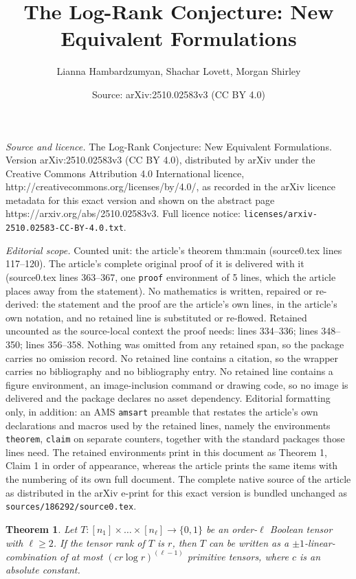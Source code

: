 \documentclass[10pt,a4paper]{amsart}
\title{The Log-Rank Conjecture: New Equivalent Formulations}
\author{Lianna Hambardzumyan, Shachar Lovett, Morgan Shirley}
\date{Source: arXiv:2510.02583v3 (CC BY 4.0)}
\newtheorem{theorem}{Theorem}
\begin{document}
\maketitle

\noindent\emph{Source and licence.} The Log-Rank Conjecture: New Equivalent Formulations. Version arXiv:2510.02583v3 (CC BY 4.0), distributed by arXiv under the Creative Commons Attribution 4.0 International licence, http://creativecommons.org/licenses/by/4.0/, as recorded in the arXiv licence metadata for this exact version and shown on the abstract page https://arxiv.org/abs/2510.02583v3. Full licence notice: \texttt{licenses/arxiv-2510.02583-CC-BY-4.0.txt}.\par\smallskip

\noindent\textit{Editorial scope.} Counted unit: the article's theorem thm:main (source0.tex lines 117--120). The article's complete original proof of it is delivered with it (source0.tex lines 363--367, one \texttt{proof} environment of 5 lines, which the article places away from the statement). No mathematics is written, repaired or re-derived: the statement and the proof are the article's own lines, in the article's own notation, and no retained line is substituted or re-flowed.  Retained uncounted as the source-local context the proof needs: lines 334--336; lines 348--350; lines 356--358.  Nothing was omitted from any retained span, so the package carries no omission record.  No retained line contains a citation, so the wrapper carries no bibliography and no bibliography entry.  No retained line contains a figure environment, an image-inclusion command or drawing code, so no image is delivered and the package declares no asset dependency.  Editorial formatting only, in addition: an AMS \texttt{amsart} preamble that restates the article's own declarations and macros used by the retained lines, namely the environments \texttt{theorem}, \texttt{claim} on separate counters, together with the standard packages those lines need.  The retained environments print in this document as Theorem 1, Claim 1 in order of appearance, whereas the article prints the same items with the numbering of its own full document.  The complete native source of the article as distributed in the arXiv e-print for this exact version is bundled unchanged as \texttt{sources/186292/source0.tex}.
\begin{theorem} \label{thm:tensors}
	Let $T: [n_1] \times \ldots \times [n_\ell] \to \{0, 1\}$ be an order-$\ell$ Boolean tensor with $\ell \geq 2$. If the tensor rank of $T$ is $r$, then $T$ can be written as a $\pm 1$-linear-combination of at most $(c r \log r)^{(\ell - 1)}$ primitive tensors, where $c$ is an absolute constant.
\end{theorem}
\end{document}
